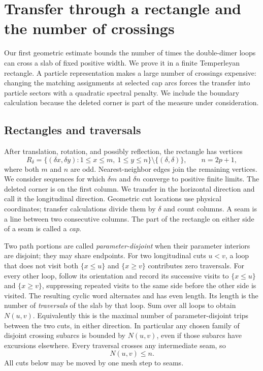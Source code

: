 \section{Transfer through a rectangle and the number of crossings}
\label{sec:transfer}

Our first geometric estimate bounds the number of times the double-dimer
loops can cross a slab of fixed positive width.  We prove it in a finite
Temperleyan rectangle.  A particle representation makes a large number of
crossings expensive: changing the matching assignments at selected cap
arcs forces the transfer into particle sectors with a quadratic spectral
penalty.  We include the boundary calculation because the deleted corner
is part of the measure under consideration.

\subsection{Rectangles and traversals}

After translation, rotation, and possibly reflection, the rectangle has
vertices
\[
 R_\delta=\{(\delta x,\delta y):1\le x\le m,\ 1\le y\le n\}
                 \setminus\{(\delta,\delta)\},
 \qquad n=2p+1,
\]
where both $m$ and $n$ are odd.  Nearest-neighbor edges join the remaining
vertices.  We consider sequences for which $\delta m$ and $\delta n$
converge to positive finite limits.  The deleted corner is on the first
column.  We transfer in the horizontal direction and call it the
longitudinal direction.  Geometric cut locations use physical coordinates;
transfer calculations divide them by $\delta$ and count columns.
A seam is a line between two consecutive columns.
The part of the rectangle on either side of a seam is called a
\emph{cap}.

Two path portions are called \emph{parameter-disjoint} when their parameter
interiors are disjoint; they may share endpoints. For two longitudinal
cuts $u<v$, a loop that does not visit both $\{x\le u\}$ and
$\{x\ge v\}$ contributes zero traversals. For every other loop,
follow its orientation and record its successive visits to
$\{x\le u\}$ and $\{x\ge v\}$, suppressing repeated visits to the same
side before the other side is visited.  The resulting cyclic word alternates and has even length.  Its length is the number
of \emph{traversals} of the slab by that loop.  Sum over all loops to
obtain $N(u,v)$.
Equivalently this is the maximal number of parameter-disjoint trips
between the two cuts, in either direction.  In particular any chosen
family of disjoint crossing subarcs is bounded by $N(u,v)$, even if
those subarcs have excursions elsewhere.  Every traversal crosses any
intermediate seam, so
\begin{equation}\label{eq:seam-max-crossings}
 N(u,v)\le n.
\end{equation}
All cuts below may be moved by one mesh step to seams.

